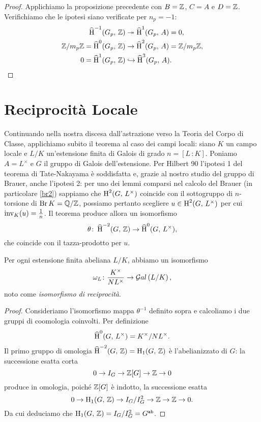 \begin{proof}
	Applichiamo la proposizione precedente con $ B = \mathbb{Z} $, $ C = A $ e $ D = \mathbb{Z} $. Verifichiamo che le ipotesi siano verificate per $ n_p = -1 $:
	\begin{align*}
		\operatorname{\widehat{H}}^{-1}(G_p,\, \mathbb{Z}) &\twoheadrightarrow \operatorname{\widehat{H}}^{1}(G_p,\, A) = 0, \\
		\mathbb{Z}/m_p\mathbb{Z}=\operatorname{\widehat{H}}^{0}(G_p,\, \mathbb{Z}) &\to \operatorname{\widehat{H}}^{2}(G_p,\, A) = \mathbb{Z}/m_p\mathbb{Z}, \\
		0 = \operatorname{\widehat{H}}^{1}(G_p,\, \mathbb{Z}) &\hookrightarrow \operatorname{\widehat{H}}^{3}(G_p,\, A).
	\end{align*}
\end{proof}

\section{Reciprocità Locale}


Continuando nella nostra discesa dall'astrazione verso la Teoria del Corpo di Classe, applichiamo subito il teorema al caso dei campi locali: siano $ K $ un campo locale e $ L / K  $ un'estensione finita di Galois di grado $ n = [L\,\colon K] $. Poniamo $ A = L^\times $ e $ G $ il gruppo di Galois dell'estensione. Per Hilbert 90 l'ipotesi 1 del teorema di Tate-Nakayama è soddisfatta e, grazie al nostro studio del gruppo di Brauer, anche l'ipotesi 2: per uno dei lemmi comparsi nel calcolo del Brauer (in particolare \ref{br2}) sappiamo che $ \operatorname{H}^2(G, \, L^\times) $ coincide con il sottogruppo di $ n $-torsione di $ \operatorname{Br} K = \mathbb{Q}/\mathbb{Z} $, possiamo pertanto scegliere $ u \in \operatorname{H}^2(G, \, L^\times) $ per cui $ \operatorname{inv}_K(u) = \frac{1}{n} $. Il teorema produce allora un isomorfismo
\[ \theta\colon \operatorname{\widehat{H}}^{-2}(G, \, \mathbb{Z}) \to \operatorname{\widehat{H}}^{0}(G, \,  L^\times), \]
che coincide con il tazza-prodotto per $ u. $

\begin{theorem}
	Per ogni estensione finita abeliana $ L/K $, abbiamo un isomorfismo
	\[ \omega_L\colon \frac{K^\times}{NL^\times} \to \mathcal{G}al\left( L/K \right), \]
	noto come \emph{isomorfismo di reciprocità}.
\end{theorem}

\begin{proof}
	Consideriamo l'isomorfismo mappa $ \theta^{-1} $ definito sopra e calcoliamo i due gruppi di coomologia coinvolti. Per definizione
	\[ \operatorname{\widehat{H}}^{0}(G, \,  L^\times) = K^\times / NL^\times. \]
	Il primo gruppo di omologia $ \operatorname{\widehat{H}}^{-2}(G, \, \mathbb{Z}) = \operatorname{H}_1(G, \, \mathbb{Z}) $ è l'abelianizzato di $ G $: la successione esatta corta
	\[ 0 \to I_G \to \mathbb{Z}[G] \to \mathbb{Z} \to 0 \]
	produce in omologia, poiché $ \mathbb{Z}[G] $ è indotto, la successione esatta
	\[ 0 \to \operatorname{H}_1(G,\, \mathbb{Z}) \to I_G/I_G^2 \to \mathbb{Z} \to \mathbb{Z} \to 0. \]
	Da cui deduciamo che $ \operatorname{H}_1(G,\, \mathbb{Z}) = I_G/I_G^2 = G^\mathtt{ab} $.
\end{proof}


